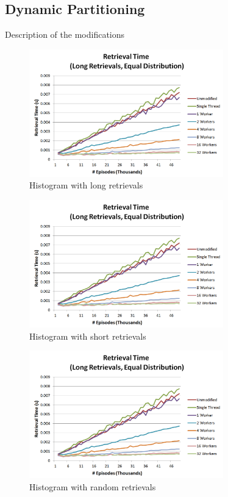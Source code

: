 \documentclass[11pt]{article} %
\begin{document}
\subsection{Dynamic Partitioning}
Description of the modifications
\begin{figure}[h]
\caption{Histogram with long retrievals}
\centering
\includegraphics[width=0.75\textwidth]{images/ret_worst_eq}
\end{figure}

\begin{figure}[h]
\caption{Histogram with short retrievals}
\centering
\includegraphics[width=0.75\textwidth]{images/ret_worst_eq}
\end{figure}

\begin{figure}[h]
\caption{Histogram with random retrievals}
\centering
\includegraphics[width=0.75\textwidth]{images/ret_worst_eq}
\end{figure}
\end{document}
